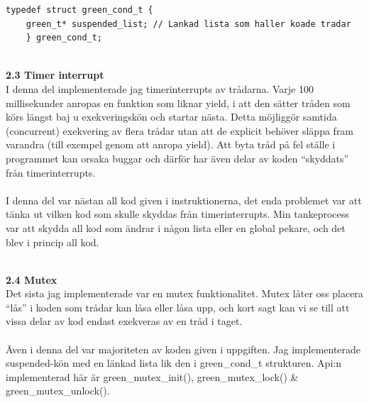 \documentclass[a4paper,10pt]{article}
\begin{document}
\begin{lstlisting}[style=CStyle]
  typedef struct green_cond_t {
    green_t* suspended_list; // Lankad lista som haller koade tradar
    } green_cond_t;

\end{lstlisting}
  

\maketitle
\textbf
    {\\2.3 Timer interrupt\\}
I denna del implementerade jag timerinterrupts av trådarna. Varje 100 millisekunder anropas en funktion som liknar yield, i att den sätter tråden som körs längst baj u exekveringskön och startar nästa. Detta möjliggör samtida (concurrent) exekvering av flera trådar utan att de explicit behöver släppa fram varandra (till exempel genom att anropa yield). Att byta tråd på fel ställe i programmet kan orsaka buggar och därför har även delar av koden ``skyddats'' från timerinterrupts.\\\\
I denna del var nästan all kod given i instruktionerna, det enda problemet var att tänka ut vilken kod som skulle skyddas från timerinterrupts. Min tankeprocess var att skydda all kod som ändrar i någon lista eller en global pekare, och det blev i princip all kod.

 
\maketitle
\textbf
{\\2.4 Mutex\\}
Det sista jag implementerade var en mutex funktionalitet. Mutex låter oss placera ``lås'' i koden som trådar kan låsa eller låsa upp, och kort sagt kan vi se till att vissa delar av kod endast exekveras av en tråd i taget. \\\\
Även i denna del var majoriteten av koden given i uppgiften. Jag implementerade suspended-kön med en länkad lista lik den i green\_cond\_t strukturen. Api:n implementerad här är green\_mutex\_init(), green\_mutex\_lock() \& green\_mutex\_unlock().
\end{document}

